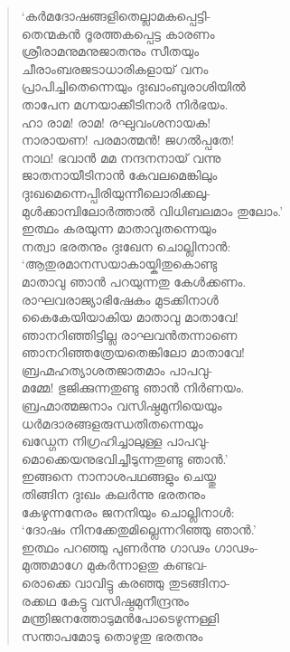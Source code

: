 \begin{verse}
‘കര്‍മദോഷങ്ങളിതെല്ലാമകപ്പെട്ടി-\\
തെന്മകന്‍ ദൂരത്തകപ്പെട്ട കാരണം\\
ശ്രീരാമനുമനുജാതനും സീതയും\\
ചീരാംബരജടാധാരികളായ് വനം\\
പ്രാപിച്ചിതെന്നെയും ദുഃഖാംബുരാശിയില്‍\\
താപേന മഗ്നയാക്കീടിനാര്‍ നിര്‍ഭയം.\\
ഹാ രാമ! രാമ! രഘുവംശനായക!\\
നാരായണ! പരമാത്മന്‍! ജഗല്‍പ്പതേ!\\
നാഥ! ഭവാന്‍ മമ നന്ദനനായ് വന്നു\\
ജാതനായീടിനാന്‍ കേവലമെങ്കിലും\\
ദുഃഖമെന്നെപ്പിരിയുന്നീലൊരിക്കലു-\\
മുള്‍ക്കാമ്പിലോര്‍ത്താല്‍ വിധിബലമാം തുലോം.’\\
ഇത്ഥം കരയുന്ന മാതാവുതന്നെയും\\
നത്വാ ഭരതനും ദുഃഖേന ചൊല്ലിനാന്‍:\\
‘ആതുരമാനസയാകായ്കിതുകൊണ്ടു\\
മാതാവു ഞാന്‍ പറയുന്നതു കേള്‍ക്കണം.\\
രാഘവരാജ്യാഭിഷേകം മുടക്കിനാള്‍\\
കൈകേയിയാകിയ മാതാവു മാതാവേ!\\
ഞാനറിഞ്ഞിട്ടില്ല രാഘവന്‍തന്നാണെ\\
ഞാനറിഞ്ഞത്രേയതെങ്കിലോ മാതാവേ!\\
ബ്രഹ്മഹത്യാശതജാതമാം പാപവു-\\
മമ്മേ! ഭുജിക്കുന്നതുണ്ടു ഞാന്‍ നിര്‍ണയം.\\
ബ്രഹ്മാത്മജനാം വസിഷ്ഠമുനിയെയും\\
ധര്‍മദാരങ്ങളരുന്ധതിതന്നെയും\\
ഖഡ്ഗേന നിഗ്രഹിച്ചാലുള്ള പാപവു-\\
മൊക്കെയനുഭവിച്ചീടുന്നതുണ്ടു ഞാന്‍.’\\
ഇങ്ങനെ നാനാശപഥങ്ങളും ചെയ്തു\\
തിങ്ങിന ദുഃഖം കലര്‍ന്നു ഭരതനും\\
കേഴുന്നനേരം ജനനിയും ചൊല്ലിനാള്‍:\\
‘ദോഷം നിനക്കേതുമില്ലെന്നറിഞ്ഞു ഞാന്‍.’\\
ഇത്ഥം പറഞ്ഞു പുണര്‍ന്നു ഗാഢം ഗാഢം-\\
മുത്തമാഗേ മുകര്‍ന്നാളതു കണ്ടവ-\\
രൊക്കെ വാവിട്ടു കരഞ്ഞു തുടങ്ങിനാ-\\
രക്കഥ കേട്ടു വസിഷ്ഠമുനീന്ദ്രനും\\
മന്ത്രിജനത്തോടുമന്‍പോടെഴുന്നള്ളി\\
സന്താപമോടു തൊഴുതു ഭരതനും\\

\end{verse}
